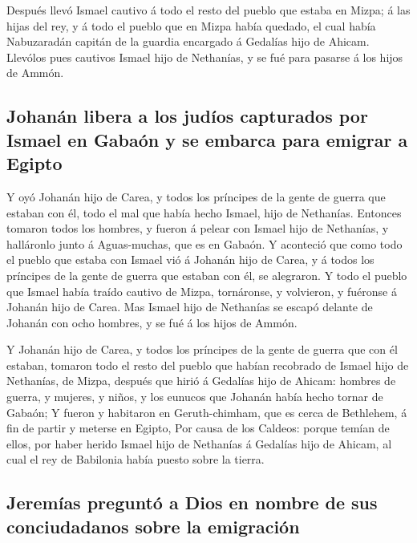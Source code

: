  Después llevó Ismael cautivo á todo el resto del pueblo
que estaba en Mizpa; á las hijas del rey, y á todo el pueblo que en
Mizpa había quedado, el cual había Nabuzaradán capitán de la guardia
encargado á Gedalías hijo de Ahicam. Llevólos pues cautivos Ismael hijo
de Nethanías, y se fué para pasarse á los hijos de Ammón.

\hypertarget{johanuxe1n-libera-a-los-juduxedos-capturados-por-ismael-en-gabauxf3n-y-se-embarca-para-emigrar-a-egipto}{%
\subsection{Johanán libera a los judíos capturados por Ismael en Gabaón
y se embarca para emigrar a
Egipto}\label{johanuxe1n-libera-a-los-juduxedos-capturados-por-ismael-en-gabauxf3n-y-se-embarca-para-emigrar-a-egipto}}

 Y oyó Johanán hijo de Carea, y todos los príncipes de la
gente de guerra que estaban con él, todo el mal que había hecho Ismael,
hijo de Nethanías.  Entonces tomaron todos los hombres, y
fueron á pelear con Ismael hijo de Nethanías, y halláronlo junto á
Aguas-muchas, que es en Gabaón.  Y aconteció que como
todo el pueblo que estaba con Ismael vió á Johanán hijo de Carea, y á
todos los príncipes de la gente de guerra que estaban con él, se
alegraron.  Y todo el pueblo que Ismael había traído
cautivo de Mizpa, tornáronse, y volvieron, y fuéronse á Johanán hijo de
Carea.  Mas Ismael hijo de Nethanías se escapó delante de
Johanán con ocho hombres, y se fué á los hijos de Ammón.

 Y Johanán hijo de Carea, y todos los príncipes de la
gente de guerra que con él estaban, tomaron todo el resto del pueblo que
habían recobrado de Ismael hijo de Nethanías, de Mizpa, después que
hirió á Gedalías hijo de Ahicam: hombres de guerra, y mujeres, y niños,
y los eunucos que Johanán había hecho tornar de Gabaón; 
Y fueron y habitaron en Geruth-chimham, que es cerca de Bethlehem, á fin
de partir y meterse en Egipto,  Por causa de los Caldeos:
porque temían de ellos, por haber herido Ismael hijo de Nethanías á
Gedalías hijo de Ahicam, al cual el rey de Babilonia había puesto sobre
la tierra.

\hypertarget{jeremuxedas-preguntuxf3-a-dios-en-nombre-de-sus-conciudadanos-sobre-la-emigraciuxf3n}{%
\subsection{Jeremías preguntó a Dios en nombre de sus conciudadanos
sobre la
emigración}\label{jeremuxedas-preguntuxf3-a-dios-en-nombre-de-sus-conciudadanos-sobre-la-emigraciuxf3n}}

